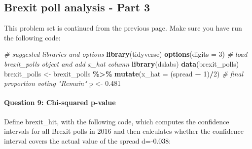 \documentclass[
]{article}
\newenvironment{Shaded}{\begin{snugshade}}{\end{snugshade}}
\newcommand{\CommentTok}[1]{\textcolor[rgb]{0.56,0.35,0.01}{\textit{#1}}}
\newcommand{\DataTypeTok}[1]{\textcolor[rgb]{0.13,0.29,0.53}{#1}}
\newcommand{\DecValTok}[1]{\textcolor[rgb]{0.00,0.00,0.81}{#1}}
\newcommand{\FloatTok}[1]{\textcolor[rgb]{0.00,0.00,0.81}{#1}}
\newcommand{\KeywordTok}[1]{\textcolor[rgb]{0.13,0.29,0.53}{\textbf{#1}}}
\newcommand{\NormalTok}[1]{#1}
\newcommand{\OperatorTok}[1]{\textcolor[rgb]{0.81,0.36,0.00}{\textbf{#1}}}
\newcommand{\StringTok}[1]{\textcolor[rgb]{0.31,0.60,0.02}{#1}}
\begin{document}
\hypertarget{brexit-poll-analysis---part-3}{%
\subsection{Brexit poll analysis - Part
3}\label{brexit-poll-analysis---part-3}}

This problem set is continued from the previous page. Make sure you have
run the following code:

\begin{Shaded}
\begin{Highlighting}[]
\CommentTok{\# suggested libraries and options}
\KeywordTok{library}\NormalTok{(tidyverse)}
\KeywordTok{options}\NormalTok{(}\DataTypeTok{digits =} \DecValTok{3}\NormalTok{)}
\CommentTok{\# load brexit\_polls object and add x\_hat column}
\KeywordTok{library}\NormalTok{(dslabs)}
\KeywordTok{data}\NormalTok{(brexit\_polls)}
\NormalTok{brexit\_polls \textless{}{-}}\StringTok{ }\NormalTok{brexit\_polls }\OperatorTok{\%\textgreater{}\%}
\StringTok{    }\KeywordTok{mutate}\NormalTok{(}\DataTypeTok{x\_hat =}\NormalTok{ (spread }\OperatorTok{+}\StringTok{ }\DecValTok{1}\NormalTok{)}\OperatorTok{/}\DecValTok{2}\NormalTok{)}
\CommentTok{\# final proportion voting "Remain"}
\NormalTok{p \textless{}{-}}\StringTok{ }\FloatTok{0.481}
\end{Highlighting}
\end{Shaded}

\hypertarget{question-9-chi-squared-p-value}{%
\paragraph{Question 9: Chi-squared
p-value}\label{question-9-chi-squared-p-value}}

Define brexit\_hit, with the following code, which computes the
confidence intervals for all Brexit polls in 2016 and then calculates
whether the confidence interval covers the actual value of the spread
d=-0.038:
\end{document}
